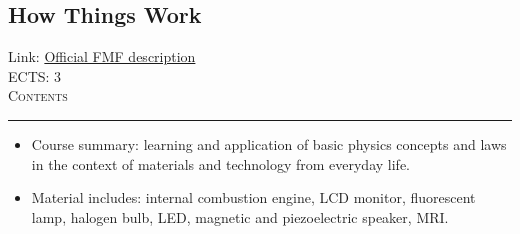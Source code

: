 \documentclass[11pt, a4paper]{article}
\newenvironment{course}[3]{
\subsection{#1}%
Link: \href{#2}{Official FMF description}\\%
ECTS: #3%
\vspace{1ex}
\\
{\large \textsc{Contents}}\\[-0.9ex]%
\rule{\textwidth}{0.5pt}
\vspace{-3ex}
}
{}
\newenvironment{chapter}[1]{
\begin{tcolorbox}[title=#1, breakable]
}
{\end{tcolorbox}}
\begin{document}
\begin{course}{How Things Work}{https://www.fmf.uni-lj.si/en/study-physics/programmes/1fiz/2020/7000777/courses/1151/}{3}
    \label{how_things_work}

    \begin{chapter}{Material}
        \begin{itemize}
        
            \item Course summary: learning and application of basic physics concepts and laws in the context of materials and technology from everyday life.

            \item Material includes: internal combustion engine, LCD monitor, fluorescent lamp, halogen bulb, LED, magnetic and piezoelectric speaker, MRI.
        
        \end{itemize}
    \end{chapter}
\end{course}

\newpage
\end{document}
